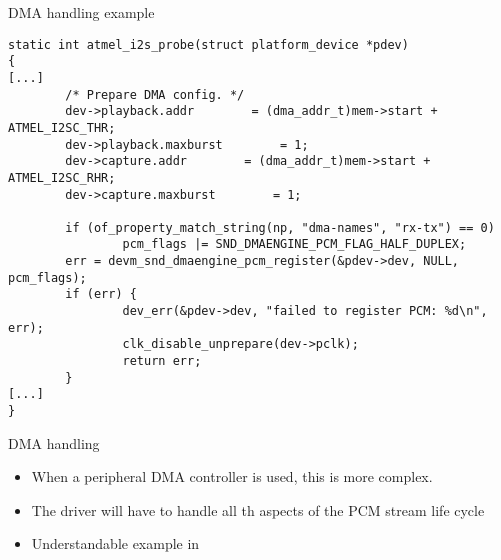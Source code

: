 \begin{frame}[fragile]{DMA handling example}
  \begin{block}{}
    \fontsize{8}{8}\selectfont
    \begin{verbatim}
static int atmel_i2s_probe(struct platform_device *pdev)
{
[...]
        /* Prepare DMA config. */
        dev->playback.addr        = (dma_addr_t)mem->start + ATMEL_I2SC_THR;
        dev->playback.maxburst        = 1;
        dev->capture.addr        = (dma_addr_t)mem->start + ATMEL_I2SC_RHR;
        dev->capture.maxburst        = 1;

        if (of_property_match_string(np, "dma-names", "rx-tx") == 0)
                pcm_flags |= SND_DMAENGINE_PCM_FLAG_HALF_DUPLEX;
        err = devm_snd_dmaengine_pcm_register(&pdev->dev, NULL, pcm_flags);
        if (err) {
                dev_err(&pdev->dev, "failed to register PCM: %d\n", err);
                clk_disable_unprepare(dev->pclk);
                return err;
        }
[...]
}
    \end{verbatim}
  \end{block}
\end{frame}

\begin{frame}{DMA handling}
  \begin{itemize}
  \item When a peripheral DMA controller is used, this is more
    complex.
  \item The driver will have to handle all th aspects of the PCM
    stream life cycle
  \item Understandable example in 
  \end{itemize}
\end{frame}


